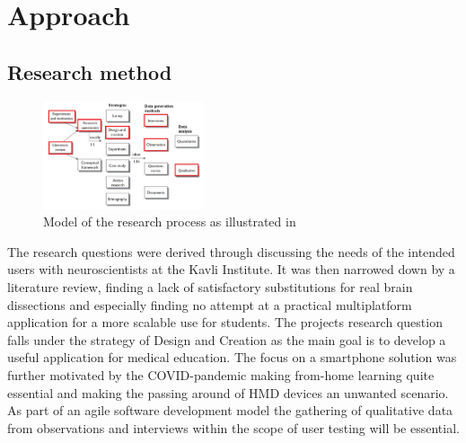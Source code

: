 


\section{Approach}


\subsection*{Research method}

\begin{figure}
    \begin{center}
        \includegraphics[width=0.42\textwidth]{fig/researchplan_image}
    \end{center}
    \caption{Model of the research process as illustrated in \citet{oates2006} }
    \label{researchplan_img}
\end{figure}

The research questions were derived through discussing the needs of the intended users with neuroscientists at the Kavli Institute. It was then narrowed down by a literature review, finding a lack of satisfactory substitutions for real brain dissections and especially finding no attempt at a practical multiplatform application for a more scalable use for students. The projects research question falls under the strategy of Design and Creation as the main goal is to develop a useful application for medical education. The focus on a smartphone solution was further motivated by the COVID-pandemic making from-home learning quite essential and making the passing around of HMD devices an unwanted scenario. As part of an agile software development model the gathering of qualitative data from observations and interviews within the scope of user testing will be essential. 

